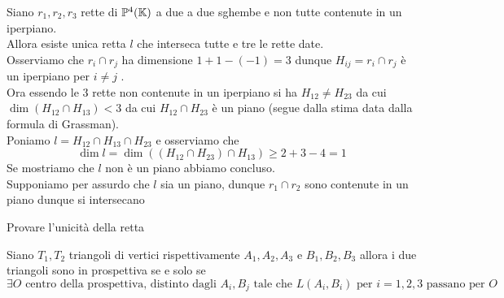\begin{ese}Siano $r_1,r_2,r_3$ rette di $\mathbb{P}^4(\mathbb{K})$ a due a due sghembe e non tutte contenute in un iperpiano.\\
Allora esiste unica retta $l$ che interseca tutte e tre le rette date.\\
Osserviamo che $r_i\cap r_j$ ha dimensione $1+1-(-1)=3$ dunque $H_{ij} = r_i\cap r_j$ \`e un iperpiano per $i\neq j$ .\\
Ora essendo le 3 rette non contenute in un iperpiano si ha $H_{12}\neq H_{23}$ da cui $\dim(H_{12}\cap H_{13})<3$ da cui $H_{12}\cap H_{23}$ \`e un piano (segue dalla stima data dalla formula di Grassman).\\
Poniamo $l=H_{12}\cap H_{13} \cap H_{23}$ e osserviamo che 
$$ \dim  l = \dim( (H_{12} \cap H_{23})\cap H_{13}) \geq 2+3 -4 = 1$$ 
Se mostriamo che $l$ non \`e un piano abbiamo concluso.\\
Supponiamo per assurdo che $l$ sia un piano, dunque $r_1\cap r_2$ sono contenute in un piano dunque si intersecano
\begin{ex}Provare l'unicit\`a della retta
\end{ex}
\end{ese}
\newpage
\begin{defn}
Siano $T_1,T_2$ triangoli di vertici rispettivamente 
$A_1,A_2, A_3$ e $B_1,B_2,B_3$ allora i due triangoli sono in prospettiva se e solo se 
$$ \exists O \text{ centro della prospettiva, distinto dagli } A_i, B_j \text{ tale che } L(A_i,B_i) \text{ per } i=1,2,3 \text{ passano per } O$$
\end{defn}

